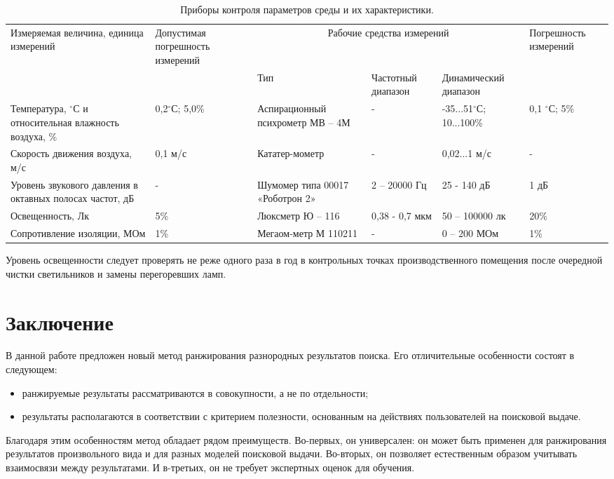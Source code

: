 \documentclass[12pt,a4paper]{report}
\begin{document}
\begin{table}[h]
\begin{center}
\begin{tabular}{|p{2.65cm}|p{2.2cm}|p{2.8cm}|p{2cm}|p{2.55cm}|p{2.4cm}|}
\hline
Измеряемая величина, единица измерений  &Допустимая погрешность измерений  &\multicolumn{3}{|c|}{Рабочие средства измерений}    &Погрешность измерений\\
\cline{3-5}
  &  &Тип  &Частотный диапазон  &Динамический диапазон & \\
\hline
Температура, $^\circ$С и относительная  влажность воздуха, \%    &0,2$^\circ$С; 5,0\%  &Аспирационный психрометр МВ – 4М	  &-  &-35...51$^\circ$С; 10...100\%	  &0,1 $^\circ$С; 5\% \\
\hline
Скорость движения воздуха, м/с	  &0,1 м/с    &Кататер-мометр    &-    &0,02...1 м/с     &-\\
\hline
Уровень звукового давления в октавных полосах частот, дБ	  &-	  &Шумомер типа 00017 «Роботрон 2»	  &2 – 20000 Гц	  &25 - 140 дБ	  &1 дБ\\
\hline
Освещенность, Лк	  &5\%	  &Люксметр	Ю – 116	  &0,38 - 0,7 мкм	  &50 – 100000 лк	  &20\%\\
\hline
Сопротивление изоляции, МОм	  &1\%	  &Мегаом-метр М 110211	  &-	  &0 – 200 МОм	  &1\%\\
\hline
\end{tabular}
\end{center}
\caption{Приборы контроля параметров среды и их характеристики.}
\label{tb:bgd6}
\end{table}

Уровень освещенности следует проверять не реже одного раза в год в контрольных точках производственного помещения после очередной чистки светильников и замены перегоревших ламп.

\chapter*{Заключение}

В данной работе предложен новый метод ранжирования разнородных результатов поиска. Его отличительные особенности состоят в следующем:
\begin{itemize}
  \item ранжируемые результаты рассматриваются в совокупности, а не по отдельности;
  \item результаты располагаются в соответствии с критерием полезности, основанным на действиях пользователей на поисковой выдаче. %
\end{itemize}
Благодаря этим особенностям метод обладает рядом преимуществ. Во-первых, он универсален: он может быть применен для ранжирования результатов произвольного вида и для разных моделей поисковой выдачи. Во-вторых, он позволяет естественным образом учитывать взаимосвязи между результатами. И в-третьих, он не требует экспертных оценок для обучения. 
\end{document}
